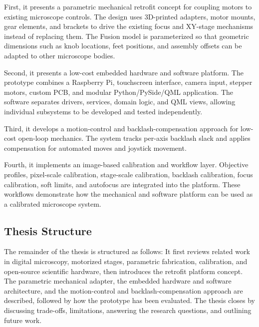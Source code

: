 First, it presents a parametric mechanical retrofit concept for coupling motors to existing microscope controls. The design uses 3D-printed adapters, motor mounts, gear elements, and brackets to drive the existing focus and XY-stage mechanisms instead of replacing them. The Fusion model is parameterized so that geometric dimensions such as knob locations, feet positions, and assembly offsets can be adapted to other microscope bodies.

Second, it presents a low-cost embedded hardware and software platform. The prototype combines a Raspberry Pi, touchscreen interface, camera input, stepper motors, custom PCB, and modular Python/PySide/QML application. The software separates drivers, services, domain logic, and QML views, allowing individual subsystems to be developed and tested independently.

Third, it develops a motion-control and backlash-compensation approach for low-cost open-loop mechanics. The system tracks per-axis backlash slack and applies compensation for automated moves and joystick movement.

Fourth, it implements an image-based calibration and workflow layer. Objective profiles, pixel-scale calibration, stage-scale calibration, backlash calibration, focus calibration, soft limits, and autofocus are integrated into the platform. These workflows demonstrate how the mechanical and software platform can be used as a calibrated microscope system.

\subsection{Thesis Structure}

The remainder of the thesis is structured as follows: It first reviews related work in digital microscopy, motorized stages, parametric fabrication, calibration, and open-source scientific hardware, then introduces the retrofit platform concept. The parametric mechanical adapter, the embedded hardware and software architecture, and the motion-control and backlash-compensation approach are described, followed by how the prototype has been evaluated. The thesis closes by discussing trade-offs, limitations, answering the research questions, and outlining future work.
